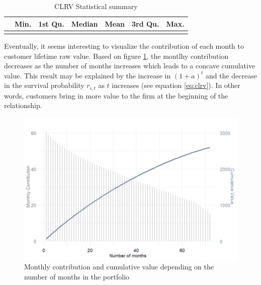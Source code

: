 \documentclass[
]{book}
\begin{document}
\begin{table}[H]

\caption{\label{tab:custValuesStats}CLRV Statistical summary}
\centering
\begin{tabular}[t]{lrrrrrr}
\toprule
  & Min. & 1st Qu. & Median & Mean & 3rd Qu. & Max.\\
\midrule
\cellcolor{gray!6}{} & \cellcolor{gray!6}{323.99} & \cellcolor{gray!6}{1125.9} & \cellcolor{gray!6}{2104.66} & \cellcolor{gray!6}{2598.12} & \cellcolor{gray!6}{3850.41} & \cellcolor{gray!6}{6815.42}\\
\bottomrule
\end{tabular}
\end{table}

Eventually, it seems interesting to visualize the contribution of each month to customer lifetime raw value. Based on figure \ref{fig:clrvEvolution}, the montlhy contribution decreases as the number of months increases which leads to a concave cumulative value. This result may be explained by the increase in \((1+a)^t\) and the decrease in the survival probability \(r_{i,t}\) as \(t\) increases (see equation \eqref{eq:clrv}). In other words, customers bring in more value to the firm at the beginning of the relationship.

\begin{figure}

{\centering \includegraphics[width=12.5in]{./imgs/clrv_evolution} 

}

\caption{Monthly contribution and cumulative value depending on the number of months in the portfolio}\label{fig:clrvEvolution}
\end{figure}
\end{document}
